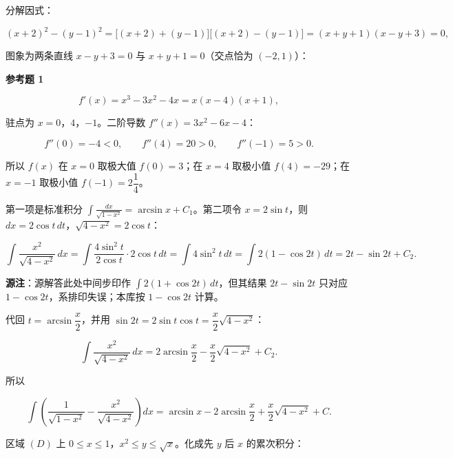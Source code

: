 \begin{answer}
分解因式：

\nopagebreak[4]
\[
(x+2)^2-(y-1)^2=\bigl[(x+2)+(y-1)\bigr]\bigl[(x+2)-(y-1)\bigr]=(x+y+1)(x-y+3)=0,
\]

图象为两条直线 $x-y+3=0$ 与 $x+y+1=0$（交点恰为 $(-2,1)$）：
\nopagebreak[4]
\begin{center}\end{center}
\nopagebreak[4]
\textbf{参考题 1}


\nopagebreak[4]
\[
f'(x)=x^3-3x^2-4x=x(x-4)(x+1),
\]

驻点为 $x=0$，$4$，$-1$。二阶导数 $f''(x)=3x^2-6x-4$：

\nopagebreak[4]
\[
f''(0)=-4<0,
\qquad
f''(4)=20>0,
\qquad
f''(-1)=5>0.
\]

所以 $f(x)$ 在 $x=0$ 取极大值 $f(0)=3$；在 $x=4$ 取极小值 $f(4)=-29$；在 $x=-1$ 取极小值 $f(-1)=2\dfrac14$。


第一项是标准积分 $\displaystyle\int\frac{dx}{\sqrt{1-x^2}}=\arcsin x+C_1$。第二项令 $x=2\sin t$，则 $dx=2\cos t\,dt$，$\sqrt{4-x^2}=2\cos t$：

\nopagebreak[4]
\[
\int\frac{x^2}{\sqrt{4-x^2}}\,dx
=\int\frac{4\sin^2t}{2\cos t}\cdot2\cos t\,dt
=\int4\sin^2t\,dt
=\int2(1-\cos2t)\,dt
=2t-\sin2t+C_2.
\]

\begin{gktip}
\textbf{源注}：源解答此处中间步印作 $\int2(1+\cos2t)\,dt$，但其结果 $2t-\sin2t$ 只对应 $1-\cos2t$，系排印失误；本库按 $1-\cos2t$ 计算。
\end{gktip}

代回 $t=\arcsin\dfrac x2$，并用 $\sin2t=2\sin t\cos t=\dfrac x2\sqrt{4-x^2}$：

\nopagebreak[4]
\[
\int\frac{x^2}{\sqrt{4-x^2}}\,dx
=2\arcsin\frac x2-\frac x2\sqrt{4-x^2}+C_2.
\]

所以

\nopagebreak[4]
\[
\int\left(\frac{1}{\sqrt{1-x^2}}-\frac{x^2}{\sqrt{4-x^2}}\right)dx
=\arcsin x-2\arcsin\frac x2+\frac x2\sqrt{4-x^2}+C.
\]

\nopagebreak[4]
\begin{center}\end{center}
\nopagebreak[4]
区域 $(D)$ 上 $0\le x\le1$，$x^2\le y\le\sqrt x$。化成先 $y$ 后 $x$ 的累次积分：


\end{answer}

